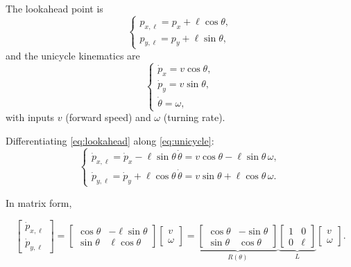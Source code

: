 \documentclass[../../master-handout.tex]{subfiles}
\begin{document}
The lookahead point is
\begin{equation}
    \begin{cases}
        p_{x,\ell} = p_x + \ell \cos\theta, \\
        p_{y,\ell} = p_y + \ell \sin\theta,
    \end{cases}
    \label{eq:lookahead}
\end{equation}
and the unicycle kinematics are
\begin{equation}
    \begin{cases}
        \dot{p}_x = v \cos\theta, \\
        \dot{p}_y = v \sin\theta, \\
        \dot{\theta} = \omega,
    \end{cases}
    \label{eq:unicycle}
\end{equation}
with inputs $v$ (forward speed) and $\omega$ (turning rate).

Differentiating \eqref{eq:lookahead} along \eqref{eq:unicycle}:
\begin{equation}
    \begin{cases}
        \dot{p}_{x,\ell} = \dot{p}_x - \ell \sin\theta \, \dot{\theta}
            = v\cos\theta - \ell \sin\theta \, \omega, \\
        \dot{p}_{y,\ell} = \dot{p}_y + \ell \cos\theta \, \dot{\theta}
            = v\sin\theta + \ell \cos\theta \, \omega.
    \end{cases}
\end{equation}

In matrix form,
\begin{fullwidth}
\begin{equation}
    \begin{bmatrix} \dot{p}_{x,\ell} \\ \dot{p}_{y,\ell} \end{bmatrix}
    =
    \begin{bmatrix}
        \cos\theta & -\ell\sin\theta \\
        \sin\theta & \ell\cos\theta
    \end{bmatrix}
    \begin{bmatrix} v \\ \omega \end{bmatrix}
    =
    \underbrace{
    \begin{bmatrix}
        \cos\theta & -\sin\theta \\
        \sin\theta & \cos\theta
    \end{bmatrix}}_{R(\theta)}
    \underbrace{
    \begin{bmatrix} 1 & 0 \\ 0 & \ell \end{bmatrix}}_{L}
    \begin{bmatrix} v \\ \omega \end{bmatrix}.
    \label{eq:RL}
\end{equation}
\end{fullwidth}
\end{document}
